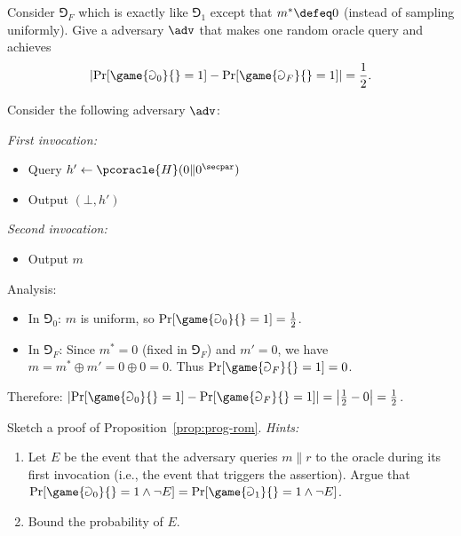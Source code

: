 \begin{exercise}
  Consider $\Game_F$ which is exactly like $\Game_1$ except that $m^* \defeq 0$ (instead of sampling uniformly). Give a \ppt adversary $\adv$ that makes one random oracle query and achieves
  \[
    \left|\Pr[\game{\Game_0}{} = 1] - \Pr[\game{\Game_F}{} = 1]\right| = \frac{1}{2}.
  \]
\end{exercise}

\ifsolutions
\begin{mysolution}
  Consider the following adversary $\adv$:
  
  \emph{First invocation:}
  \begin{itemize}
    \item Query $h' \gets \pcoracle{H}(0 \| 0^\secpar)$
    \item Output $(\bot, h')$
  \end{itemize}
  
  \emph{Second invocation:}
  \begin{itemize}
    \item Output $m$
  \end{itemize}
  
  Analysis:
  \begin{itemize}
    \item In $\Game_0$: $m$ is uniform, so $\Pr[\game{\Game_0}{} = 1] = \frac{1}{2}$.
    \item In $\Game_F$: Since $m^* = 0$ (fixed in $\Game_F$) and $m' = 0$, we have $m = m^* \oplus m' = 0 \oplus 0 = 0$. Thus $\Pr[\game{\Game_F}{} = 1] = 0$.
  \end{itemize}
  
  Therefore: $\left|\Pr[\game{\Game_0}{} = 1] - \Pr[\game{\Game_F}{} = 1]\right| = \left|\frac{1}{2} - 0\right| = \frac{1}{2}$.
\end{mysolution}
\fi

\begin{exercise}\label{ex:prog-rom}
  Sketch a proof of Proposition~\ref{prop:prog-rom}.
  \emph{Hints:}
  \begin{enumerate}
    \item Let $E$ be the event that the adversary queries $m \| r$ to the oracle during its first invocation (i.e., the event that triggers the assertion).
    Argue that $\Pr[\game{\Game_0}{} = 1 \wedge \neg E] = \Pr[\game{\Game_1}{} = 1 \wedge \neg E]$.
    \item Bound the probability of $E$.
  \end{enumerate}
\end{exercise}

